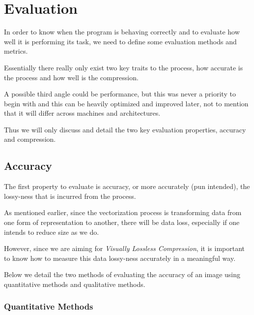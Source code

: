 \documentclass[12pt]{article}
\newcommand{\sentence}{} %
\newcommand{\italic}[1]{\textit{#1}}
\begin{document}
    \pagebreak


    \section{Evaluation}\label{sec:evaluation}

    \tab
    In order to know when the program is behaving correctly and to evaluate how well it is performing its task, we
    need to define some evaluation methods and metrics.
    \sentence
    Essentially there really only exist two key traits to the process, how accurate is the process and how well is
    the compression.
    \sentence
    A possible third angle could be performance, but this was never a priority to begin with and this can be heavily
    optimized and improved later, not to mention that it will differ across machines and architectures.
    \sentence
    Thus we will only discuss and detail the two key evaluation properties, accuracy and compression.

    \subsection{Accuracy}\label{subsec:accuracy}

    \tab
    The first property to evaluate is accuracy, or more accurately (pun intended), the lossy-ness that is incurred
    from the process.
    \sentence
    As mentioned earlier, since the vectorization process is transforming data from one form of representation to
    another, there will be data loss, especially if one intends to reduce size as we do.
    \sentence
    However, since we are aiming for \italic{Visually Lossless Compression}, it is important to know how to measure
    this data lossy-ness accurately in a meaningful way.
    \sentence
    Below we detail the two methods of evaluating the accuracy of an image using quantitative methods and qualitative
    methods.

    \subsubsection{Quantitative Methods}\label{subsubsec:quantitative-methods}
\end{document}
